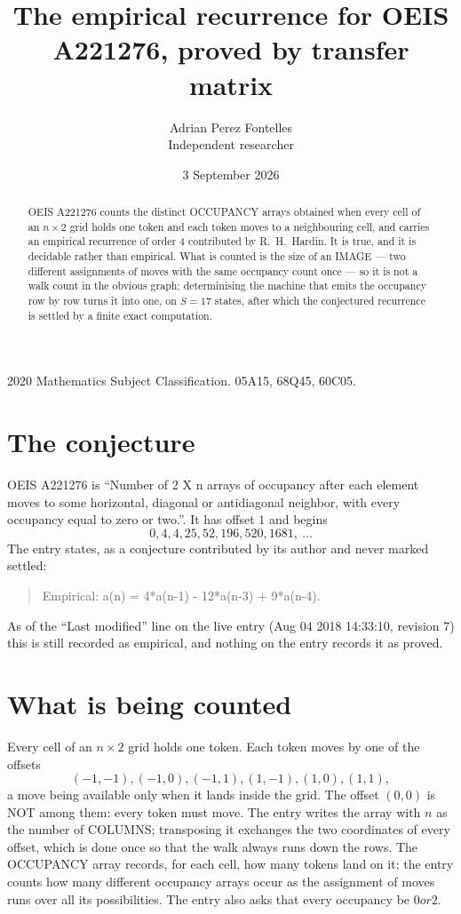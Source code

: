 \documentclass[11pt,a4paper]{article}
\title{The empirical recurrence for OEIS A221276, proved by transfer matrix}
\author{Adrian Perez Fontelles\\ \small Independent researcher}
\date{3 September 2026}
\theoremstyle{plain}
\theoremstyle{definition}
\begin{document}
\maketitle

\begin{abstract}
OEIS A221276 counts the distinct OCCUPANCY arrays obtained when every cell of an $n\times2$ grid
holds one token and each token moves to a neighbouring cell, and carries an empirical
recurrence of order $4$ contributed by R.~H.~Hardin. It is true, and it is decidable
rather than empirical. What is counted is the size of an IMAGE --- two different assignments of
moves with the same occupancy count once --- so it is not a walk count in the obvious graph;
determinising the machine that emits the occupancy row by row turns it into one, on $S=17$
states, after which the conjectured recurrence is settled by a finite exact computation.
\end{abstract}

\noindent\small 2020 Mathematics Subject Classification. 05A15, 68Q45, 60C05.\normalsize

\section{The conjecture}

OEIS A221276 is ``Number of 2 X n arrays of occupancy after each element moves to some horizontal, diagonal or antidiagonal neighbor, with every occupancy equal to zero or two.''. It has offset $1$ and begins
\[
0, 4, 4, 25, 52, 196, 520, 1681,\ \dots
\]
The entry states, as a conjecture contributed by its author and never marked settled:
\begin{quote}
Empirical: a(n) = 4*a(n-1) - 12*a(n-3) + 9*a(n-4).
\end{quote}
As of the ``Last modified'' line on the live entry (Aug 04 2018 14:33:10, revision 7) this is still
recorded as empirical, and nothing on the entry records it as proved.

\section{What is being counted}

Every cell of an $n\times2$ grid holds one token. Each token moves by one of the offsets
\[
(-1,-1), (-1,0), (-1,1), (1,-1), (1,0), (1,1),
\]
a move being available only when it lands inside the grid. The offset $(0,0)$ is NOT among them: every token must move. The entry writes the array with $n$ as the number of COLUMNS; transposing it exchanges the two coordinates of every offset, which is done once so that the walk always runs down the rows. The OCCUPANCY array
records, for each cell, how many tokens land on it; the entry counts how many different
occupancy arrays occur as the assignment of moves runs over all its possibilities. The entry also asks that every occupancy be $0 or 2$.
\end{document}
